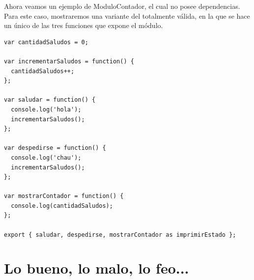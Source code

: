 Ahora veamos un ejemplo de ModuloContador, el cual no posee dependencias. Para este caso, mostraremos una variante del  totalmente válida, en la que se hace un único  de las tres funciones que expone el módulo.

\begin{lstlisting}[title={Modulo contador en ES6}]
var cantidadSaludos = 0;

var incrementarSaludos = function() {
  cantidadSaludos++;
};

var saludar = function() {
  console.log('hola');
  incrementarSaludos();
};

var despedirse = function() {
  console.log('chau');
  incrementarSaludos();
};

var mostrarContador = function() {
  console.log(cantidadSaludos);
};

export { saludar, despedirse, mostrarContador as imprimirEstado };
\end{lstlisting}

\section{Lo bueno, lo malo, lo feo...}